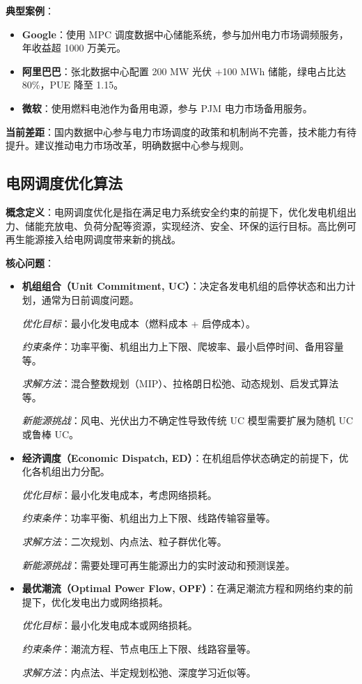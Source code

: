 \documentclass[12pt,a4paper]{article}
\begin{document}
\textbf{典型案例}：
\begin{itemize}
    \item \textbf{Google}：使用 MPC 调度数据中心储能系统，参与加州电力市场调频服务，年收益超 1000 万美元。
    \item \textbf{阿里巴巴}：张北数据中心配置 200 MW 光伏 +100 MWh 储能，绿电占比达 80\%，PUE 降至 1.15。
    \item \textbf{微软}：使用燃料电池作为备用电源，参与 PJM 电力市场备用服务。
\end{itemize}

\textbf{当前差距}：国内数据中心参与电力市场调度的政策和机制尚不完善，技术能力有待提升。建议推动电力市场改革，明确数据中心参与规则。

\subsection{电网调度优化算法}

\textbf{概念定义}：电网调度优化是指在满足电力系统安全约束的前提下，优化发电机组出力、储能充放电、负荷分配等资源，实现经济、安全、环保的运行目标。高比例可再生能源接入给电网调度带来新的挑战\cite{wood2013power}。

\textbf{核心问题}：

\begin{itemize}
    \item \textbf{机组组合（Unit Commitment, UC）}：决定各发电机组的启停状态和出力计划，通常为日前调度问题。
    
    \textit{优化目标}：最小化发电成本（燃料成本 + 启停成本）。
    
    \textit{约束条件}：功率平衡、机组出力上下限、爬坡率、最小启停时间、备用容量等。
    
    \textit{求解方法}：混合整数规划（MIP）、拉格朗日松弛、动态规划、启发式算法等。
    
    \textit{新能源挑战}：风电、光伏出力不确定性导致传统 UC 模型需要扩展为随机 UC 或鲁棒 UC\cite{wang2015security}。
    
    \item \textbf{经济调度（Economic Dispatch, ED）}：在机组启停状态确定的前提下，优化各机组出力分配。
    
    \textit{优化目标}：最小化发电成本，考虑网络损耗。
    
    \textit{约束条件}：功率平衡、机组出力上下限、线路传输容量等。
    
    \textit{求解方法}：二次规划、内点法、粒子群优化等。
    
    \textit{新能源挑战}：需要处理可再生能源出力的实时波动和预测误差\cite{zhao2015robust}。
    
    \item \textbf{最优潮流（Optimal Power Flow, OPF）}：在满足潮流方程和网络约束的前提下，优化发电出力或网络损耗。
    
    \textit{优化目标}：最小化发电成本或网络损耗。
    
    \textit{约束条件}：潮流方程、节点电压上下限、线路容量等。
    
    \textit{求解方法}：内点法、半定规划松弛、深度学习近似等。
\end{itemize}
\end{document}
